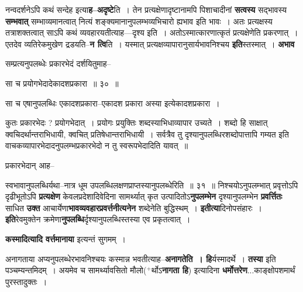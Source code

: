 \documentclass[article,12pt,a4paper]{memoir}
\newcommand{\add}[1]{($^{+}$#1)}
\begin{document}
	  \pstart नन्वदर्शनेऽपि कथं सन्देह इत्या\textbf{ह--अदृष्टे}ति । तेन प्रत्यक्षेणादृष्टानामपि पिशाचादीनां \textbf{सत्वस्य} सद्भावस्य \textbf{सम्भवात्} सम्भाव्यमानत्वात् नित्यं शङ्क्यमानानुपलम्भव्यभिचारो ह्यभाव इति भावः । अतः प्रत्यक्षस्य तत्राशक्तत्वात् साऽपि कथं व्यवहारयतीत्याह—दृश्य इति । अतोऽस्मात्कारणात्कृतं प्रत्यक्षेणेति प्रकरणात् । एतदेव व्यतिरेकमुखेण द्रडयति--\textbf{न त्वि}ति । यस्मात् प्रत्यक्षव्यापारानुसार्यभावनिश्चय \textbf{इति}स्तस्मात् । \textbf{अभाव}  \leavevmode{} 
	  
	सम्प्रत्यनुपलब्धेः प्रकारभेदं दर्शयितुमाह--  
	  
	सा च प्रयोगभेदादेकादशप्रकारा ॥ ३० ॥ 
	  
	सा च एषानुपलब्धिः एकादशप्रकारा--एकादश प्रकारा अस्या इत्येकादशप्रकारा ।  
	  
	कुतः प्रकारभेदः ? प्रयोगभेदात् । प्रयोगः प्रयुक्तिः शब्दस्याभिधाव्यापार उच्यते । शब्दो हि साक्षात् क्वचिदर्थान्तराभिधायी, क्वचित् प्रतिषेधान्तराभिधायी । सर्वत्रैव तु दृश्यानुपलब्धिरशब्दोपात्तापि गम्यत इति वाचकव्यापारभेदादनुपलम्भप्रकारभेदो न तु स्वरूपभेदादिति यावत् ॥  
	  
	प्रकारभेदान् आह-- 
	  
	स्वभावानुपलब्धिर्यथा--नात्र धूम उपलब्धिलक्षणप्राप्तस्यानुपलब्धेरिति ॥ ३१ ॥ निश्चयोऽनुपलम्भात् प्रवृत्तोऽपि दृढीभूतोऽपि \textbf{प्रत्यक्षेण} केवलप्रदेशादिवेदिना सामर्थ्यात् कृत उत्पादितोऽ\textbf{नुपलम्भेन} दृश्यानुपलम्भेन \textbf{प्रवर्त्तितः} साधित \textbf{उक्त} आचार्येणा\textbf{भावव्यवहारप्रवर्त्तनीत्यनेन} शब्देनेति बुद्धिस्थम् । \textbf{इतीत्या}दिनोपसंहारः । \textbf{इति}रेवमुक्तेन क्रमेणा\textbf{नुपलब्धि}र्दृश्यानुपलब्धिस्तस्या एव प्रकृतत्वात् ।
	\pend
      

	  \pstart \textbf{कस्मादित्यादि वर्त्तमानाया} इत्यन्तं सुगमम् ।
	\pend
      

	  \pstart अनागताया अप्यनुपलब्धेरभावनिश्चयः कस्मान्न भवतीत्याह--\textbf{अनागतेति । हि}र्यस्मादर्थे । \textbf{तस्या} इति पञ्चम्यन्तमिदम् । अयमेव च सामर्थ्यावसितो मौलो\add{र्थोऽ\textbf{नागता हि}} इत्यादिना \textbf{धर्मोत्तरेण}...काङ्क्षोपशमार्थं पुरस्तादुक्तः ।
	\pend
      
\end{document}
